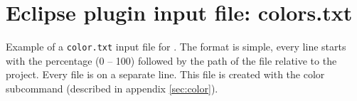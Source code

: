 \chapter{Eclipse plugin input file: colors.txt}
\label{ch:colors.txt}
Example of a \verb|color.txt| input file for . The format is simple, every line starts with the percentage (0 -- 100) followed by the path of the file relative to the project. Every file is on a separate line. This file is created with the color subcommand (described in appendix \ref{sec:color}).
